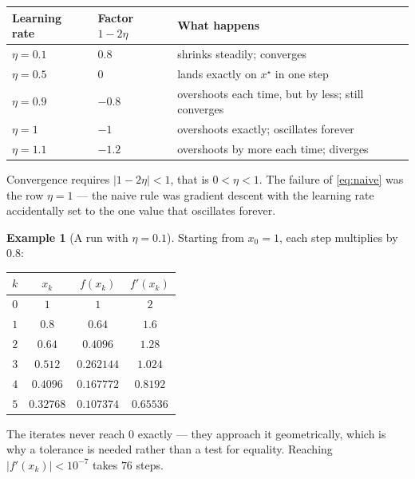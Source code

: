\documentclass[11pt]{article}
\theoremstyle{plain}
\theoremstyle{definition}
\newtheorem{ex}{Example}[section]
\theoremstyle{remark}
\newcommand{\lr}{\eta}
\begin{document}
\begin{center}
\renewcommand{\arraystretch}{1.45}
\begin{tabular}{@{}l l l@{}}
\toprule
\textbf{Learning rate} & \textbf{Factor $1-2\lr$} & \textbf{What happens} \\
\midrule
$\lr = 0.1$   & $0.8$   & shrinks steadily; converges \\
$\lr = 0.5$   & $0$     & lands exactly on $x^{\star}$ in one step \\
$\lr = 0.9$   & $-0.8$  & overshoots each time, but by less; still converges \\
$\lr = 1$     & $-1$    & overshoots exactly; oscillates forever \\
$\lr = 1.1$   & $-1.2$  & overshoots by more each time; diverges \\
\bottomrule
\end{tabular}
\end{center}

\noindent Convergence requires $|1-2\lr|<1$, that is $0<\lr<1$. The failure of
\eqref{eq:naive} was the row $\lr=1$ --- the naive rule was gradient descent with
the learning rate accidentally set to the one value that oscillates forever.

\begin{ex}[A run with $\lr=0.1$]
Starting from $x_0=1$, each step multiplies by $0.8$:
\begin{center}
\renewcommand{\arraystretch}{1.25}
\begin{tabular}{@{}c c c c@{}}
\toprule
$k$ & $x_k$ & $f(x_k)$ & $f'(x_k)$ \\
\midrule
$0$ & $1$        & $1$          & $2$ \\
$1$ & $0.8$      & $0.64$       & $1.6$ \\
$2$ & $0.64$     & $0.4096$     & $1.28$ \\
$3$ & $0.512$    & $0.262144$   & $1.024$ \\
$4$ & $0.4096$   & $0.167772$   & $0.8192$ \\
$5$ & $0.32768$  & $0.107374$   & $0.65536$ \\
\bottomrule
\end{tabular}
\end{center}
The iterates never reach $0$ exactly --- they approach it geometrically, which is
why a tolerance is needed rather than a test for equality. Reaching
$|f'(x_k)|<10^{-7}$ takes $76$ steps.
\end{ex}
\end{document}
